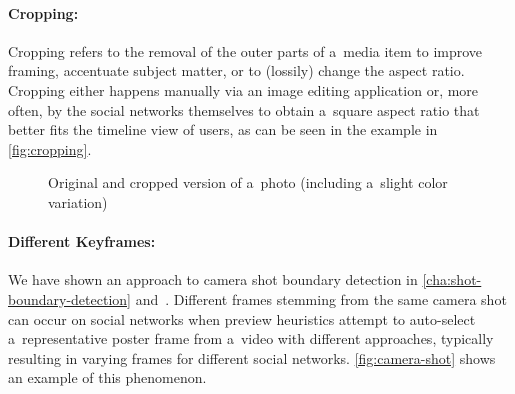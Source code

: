 \paragraph{Cropping:}

Cropping refers to the removal of the outer parts of a~media item
to improve framing, accentuate subject matter,
or to (lossily) change the aspect ratio.
Cropping either happens manually via an image editing application
or, more often, by the social networks themselves
to obtain a~square aspect ratio
that better fits the timeline view of users,
as can be seen in the example in \autoref{fig:cropping}.

\begin{figure}[!h]
  \centering
  \caption[Original and cropped version of a~photo]
  {Original and cropped version of a~photo (including a~slight color variation)}
  \label{fig:cropping}  
\end{figure}

\paragraph{Different Keyframes:}

We have shown an approach to camera shot boundary detection
in \autoref{cha:shot-boundary-detection} and~\cite{steiner2012shotdetection}.
Different frames stemming from the same camera shot
can occur on social networks when preview heuristics
attempt to auto-select a~representative poster frame from a~video with different approaches,
typically resulting in varying frames for different social networks.
\autoref{fig:camera-shot} shows an example of this phenomenon.

